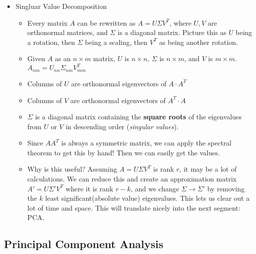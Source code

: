 \documentclass{article}
\begin{document}
\begin{itemize}
    \item Singluar Value Decomposition
    \begin{itemize}
        \item Every matrix $A$ can be rewritten as $A = U\Sigma V^T$, where $U,V$ are orthonormal matrices, and $\Sigma$ is a diagonal matrix. Picture this as $U$ being a rotation, then $\Sigma$ being a scaling, then $V^T$ as being another rotation. 
        \item Given $A$ as an $n \times m$ matrix, $U$ is $n \times n$, $\Sigma$ is $n \times m$, and $V$ is $m \times m$. $A_{nm} = U_{nn}\Sigma_{nm}V^T_{mm}$
        \item Columns of $U$ are orthonormal eigenvectors of $A\cdot A^T$
        \item Columns of $V$ are orthonormal eigenvectors of $A^T\cdot A$
        \item $\Sigma$ is a diagonal matrix containing the \textbf{square roots} of the eigenvalues from $U$ or $V$ in descending order (\textit{singular values}).
        \item Since $AA^T$ is always a symmetric matrix, we can apply the spectral theorem to get this by hand! Then we can easily get the values.
        \item Why is this useful? Assuming $A = U\Sigma V^T$ is rank $r$, it may be a lot of calculations. We can reduce this and create an approximation matrix $A' = U\Sigma' V^T$ where it is rank $r-k$, and we change $\Sigma \rightarrow \Sigma'$ by removing the $k$ least significant(absolute value) eigenvalues. This lets us clear out a lot of time and space. This will translate nicely into the next segment: PCA.
    \end{itemize}
\end{itemize}

\subsection{Principal Component Analysis}
\end{document}
